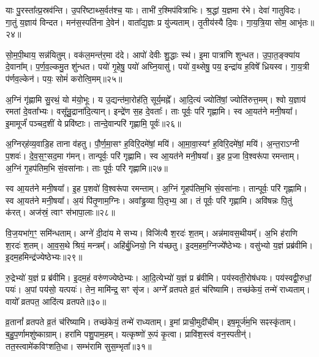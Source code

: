 याः पु॒रस्ता᳚त्प्र॒स्रव॑न्ति।
उ॒परि॑ष्टाथ्स॒र्वत॑श्च॒ याः।
ताभी॑ र॒श्मिप॑वित्राभिः।
श्र॒द्धां य॒ज्ञमा र॑भे।
देवा॑ गातुविदः।
गा॒तुं य॒ज्ञाय॑ विन्दत।
मन॑स॒स्पति॑ना दे॒वेन॑।
वाता᳚द्य॒ज्ञः प्र यु॑ज्यताम्।
तृ॒तीय॑स्यै दि॒वः।
गा॒य॒त्रि॒या सोम॒ आभृ॑तः॥२४॥\ip

सो॒म॒पी॒थाय॒ सन्न॑यितुम्।
वक॑ल॒मन्त॑र॒मा द॑दे।
आपो॑ देवीः शु॒द्धाः स्थ॑।
इ॒मा पात्रा॑णि शुन्धत।
उ॒पा॒त॒ङ्क्या॑य दे॒वाना᳚म्।
प॒र्ण॒व॒ल्कमु॒त शु॑न्धत।
पयो॑ गृ॒हेषु॒ पयो॑ अघ्नि॒यासु॑।
पयो॑ व॒थ्सेषु॒ पय॒ इन्द्रा॑य ह॒विषे᳚ ध्रियस्व।
गा॒य॒त्री प॑र्णव॒ल्केन॑।
पयः॒ सोमं॑ करोत्वि॒मम्॥२५॥\ip

अ॒ग्निं गृ॑ह्णामि सु॒रथं॒ यो म॑यो॒भूः।
य उ॒द्यन्त॑मा॒रोह॑ति॒ सूर्य॒मह्ने᳚।
आ॒दि॒त्यं ज्योति॑षां॒ ज्योति॑रुत्त॒मम्।
श्वो य॒ज्ञाय॑ रमतां दे॒वता᳚भ्यः।
वसू᳚न्रु॒द्राना॑दि॒त्यान्।
इन्द्रे॑ण स॒ह दे॒वताः᳚।
ताः पूर्वः॒ परि॑ गृह्णामि।
स्व आ॒यत॑ने मनी॒षया᳚।
इ॒मामूर्जं॑ पञ्चद॒शीं ये प्रवि॑ष्टाः।
तान्दे॒वान्परि॑ गृह्णामि॒ पूर्वः॑॥२६॥\ip

अ॒ग्निर्‌\mbox{}ह॑व्य॒वाडि॒ह ताना व॑हतु।
पौ॒र्ण॒मा॒सꣳ ह॒विरि॒दमे॑षां॒ मयि॑।
आ॒मा॒वा॒स्यꣳ॑ ह॒विरि॒दमे॑षां॒ मयि॑।
अ॒न्त॒रा\-ऽग्नी प॒शवः॑।
दे॒व॒स॒ꣳ॒सद॒मा ग॑मन्।
तान्पूर्वः॒ परि॑ गृह्णामि।
स्व आ॒यत॑ने मनी॒षया᳚।
इ॒ह प्र॒जा वि॒श्वरू॑पा रमन्ताम्।
अ॒ग्निं गृ॒हप॑तिम॒भि सं॒वसा॑नाः।
ताः पूर्वः॒ परि॑ गृह्णामि॥२७॥\ip

स्व आ॒यत॑ने मनी॒षया᳚।
इ॒ह प॒शवो॑ वि॒श्वरू॑पा रमन्ताम्।
अ॒ग्निं गृ॒हप॑तिम॒भि सं॒वसा॑नाः।
तान्पूर्वः॒ परि॑ गृह्णामि।
स्व आ॒यत॑ने मनी॒षया᳚।
अ॒यं पि॑तृ॒णाम॒ग्निः।
अवा᳚ड्ढ॒व्या पि॒तृभ्य॒ आ।
तं पूर्वः॒ परि॑ गृह्णामि।
अवि॑षन्नः पि॒तुं क॑रत्।
अज॑स्रं॒ त्वाꣳ स॑भापा॒लाः॥२८॥\ip

वि॒ज॒यभा॑ग॒ꣳ॒ समि॑न्धताम्।
अग्ने॑ दी॒दा॑य मे सभ्य।
विजि॑त्यै श॒रदः॑ श॒तम्।
अन्न॑मावस॒थीयम्᳚।
अ॒भि ह॑राणि श॒रदः॑ श॒तम्।
आ॒व॒स॒थे श्रियं॒ मन्त्रम्᳚।
अहि॑र्बु॒ध्नियो॒ नि य॑च्छतु।
इ॒द\-म॒ह\-म॒ग्नि\-ज्ये᳚ष्ठेभ्यः।
वसु॑भ्यो य॒ज्ञं प्रब्र॑वीमि।
इ॒द\-म॒ह\-मिन्द्र॑\-ज्येष्ठेभ्यः॥२९॥\ip

रु॒द्रेभ्यो॑ य॒ज्ञं प्र ब्र॑वीमि।
इ॒दम॒हं वरु॑णज्येष्ठेभ्यः।
आ॒दि॒त्येभ्यो॑ य॒ज्ञं प्र ब्र॑वीमि।
पय॑स्वती॒रोष॑धयः।
पय॑स्वद्वी॒रुधां॒ पयः॑।
अ॒पां पय॑सो॒ यत्पयः॑।
तेन॒ मामि॑न्द्र॒ सꣳ सृ॑ज।
अग्ने᳚ व्रतपते व्र॒तं च॑रिष्यामि।
तच्छ॑केयं॒ तन्मे॑ राध्यताम्।
वायो᳚ व्रतपत॒ आदि॑त्य व्रतपते॥३०॥\ip

व्र॒तानां᳚ व्रतपते व्र॒तं च॑रिष्यामि।
तच्छ॑केयं॒ तन्मे॑ राध्यताम्।
इ॒मां प्राची॒मुदी॑चीम्।
इष॒मूर्ज॑म॒भि सꣴस्कृ॑ताम्।
ब॒हु॒प॒र्णामशु॑ष्काग्राम्।
हरा॑मि पशु॒पाम॒हम्।
यत्कृष्णो॑ रू॒पं कृ॒त्वा।
प्रावि॑श॒स्त्वं वन॒स्पतीन्॑।
तत॒स्त्वामे॑कविꣳशति॒धा।
सम्भ॑रामि सुस॒म्भृता᳚॥३१॥\ip

